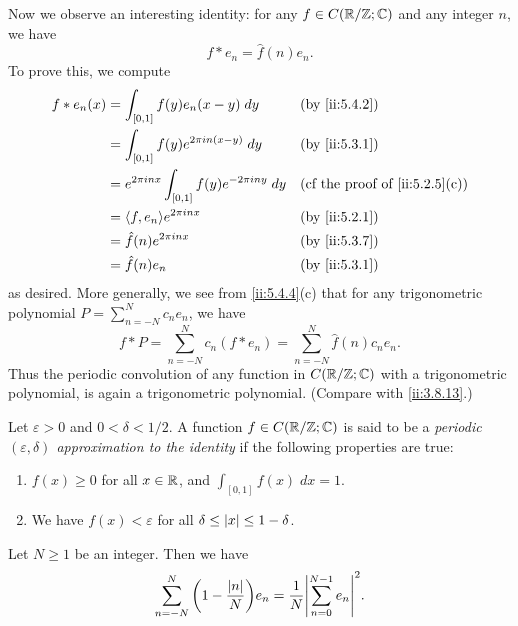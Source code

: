 \begin{ac}\label{ii:ac:5.4.1}
  Now we observe an interesting identity:
  for any \(f \in C(\mathbb{R} / \mathbb{Z} ; \mathbb{C})\) and any integer \(n\), we have
  \[
    f * e_n = \hat{f}(n) e_n.
  \]
  To prove this, we compute
  \begin{align*}
    f * e_n(x) & = \int_{[0, 1]} f(y) e_n(x - y) \; dy                        &  & \by{ii:5.4.2}                               \\
               & = \int_{[0, 1]} f(y) e^{2 \pi i n (x - y)} \; dy             &  & \by{ii:5.3.1}                               \\
               & = e^{2 \pi i n x} \int_{[0, 1]} f(y) e^{- 2 \pi i n y} \; dy &  & \text{(cf the proof of \cref{ii:5.2.5}(c))} \\
               & = \inner*{f, e_n} e^{2 \pi i n x}                            &  & \by{ii:5.2.1}                               \\
               & = \hat{f}(n) e^{2 \pi i n x}                                 &  & \by{ii:5.3.7}                               \\
               & = \hat{f}(n) e_n                                             &  & \by{ii:5.3.1}
  \end{align*}
  as desired.
  More generally, we see from \cref{ii:5.4.4}(c) that for any trigonometric polynomial \(P = \sum_{n = -N}^N c_n e_n\), we have
  \[
    f * P = \sum_{n = -N}^N c_n (f * e_n) = \sum_{n = -N}^N \hat{f}(n) c_n e_n.
  \]
  Thus the periodic convolution of any function in \(C(\mathbb{R} / \mathbb{Z} ; \mathbb{C})\) with a trigonometric polynomial, is again a trigonometric polynomial.
  (Compare with \cref{ii:3.8.13}.)
\end{ac}

\begin{defn}\label{ii:5.4.5}
  Let \(\varepsilon > 0\) and \(0 < \delta < 1 / 2\).
  A function \(f \in C(\mathbb{R} / \mathbb{Z} ; \mathbb{C})\) is said to be a \emph{periodic \((\varepsilon, \delta)\) approximation to the identity} if the following properties are true:
  \begin{enumerate}
    \item \(f(x) \geq 0\) for all \(x \in \mathbb{R}\), and \(\int_{[0, 1]} f(x) \; dx = 1\).
    \item We have \(f(x) < \varepsilon\) for all \(\delta \leq \left\lvert x\right\rvert \leq 1 - \delta\).
  \end{enumerate}
\end{defn}

\begin{ac}\label{ii:ac:5.4.2}
  Let \(N \geq 1\) be an integer.
  Then we have
  \[
    \sum_{n = -N}^N \bigg(1 - \dfrac{\abs{n}}{N}\bigg) e_n = \dfrac{1}{N} \abs{\sum_{n = 0}^{N - 1} e_n}^2.
  \]
\end{ac}

